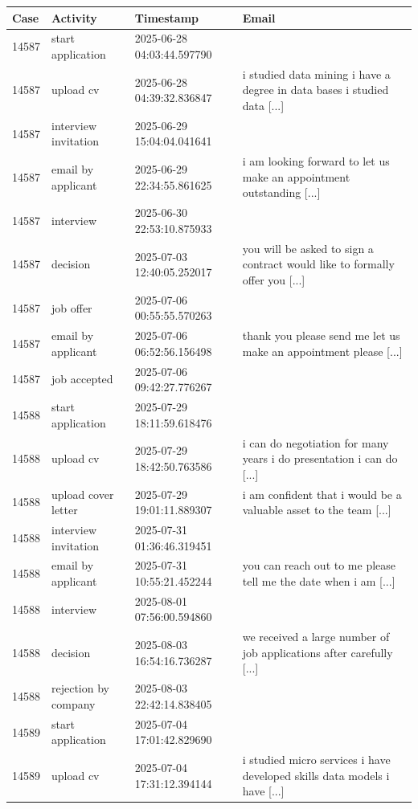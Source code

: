 \begin{appendices}
\begin{table}[!h]
	\tiny
	\setlength\tabcolsep{2pt}
	\begin{tabularx}{\textwidth}{lllp{8.5cm}}
		\toprule
		\textbf{Case} & \textbf{Activity} & \textbf{Timestamp} & \textbf{Email} \\
		\midrule
14587&start application&2025-06-28 04:03:44.597790\\
14587&upload cv&2025-06-28 04:39:32.836847&i studied data mining i have a degree in data bases i studied data [...] \\
14587&interview invitation&2025-06-29 15:04:04.041641&\\
14587&email by applicant&2025-06-29 22:34:55.861625&i am looking forward to let us make an appointment outstanding  [...]\\
14587&interview&2025-06-30 22:53:10.875933&\\
14587&decision&2025-07-03 12:40:05.252017&you will be asked to sign a contract would like to formally offer you  [...] \\
14587&job offer&2025-07-06 00:55:55.570263&\\
14587&email by applicant&2025-07-06 06:52:56.156498&thank you please send me let us make an appointment please  [...] \\
14587&job accepted&2025-07-06 09:42:27.776267&\\
14588&start application&2025-07-29 18:11:59.618476&\\
14588&upload cv&2025-07-29 18:42:50.763586&i can do negotiation for many years i do presentation i can do  [...] \\
14588&upload cover letter&2025-07-29 19:01:11.889307&i am confident that i would be a valuable asset to the team  [...] \\
14588&interview invitation&2025-07-31 01:36:46.319451&\\
14588&email by applicant&2025-07-31 10:55:21.452244&you can reach out to me please tell me the date when i am  [...] \\
14588&interview&2025-08-01 07:56:00.594860&\\
14588&decision&2025-08-03 16:54:16.736287&we received a large number of job applications after carefully [...] \\
14588&rejection by company&2025-08-03 22:42:14.838405&\\
14589&start application&2025-07-04 17:01:42.829690&\\
14589&upload cv&2025-07-04 17:31:12.394144&i studied micro services i have developed skills data models i have  [...] \\

\end{tabularx}
\end{table}
\end{appendices}
